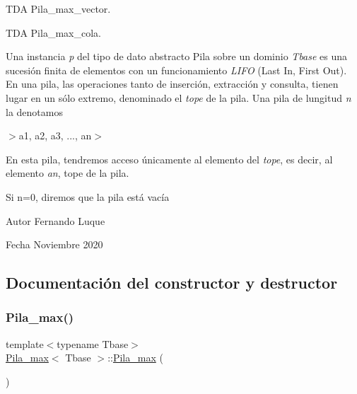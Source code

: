 T\+DA Pila\+\_\+max\+\_\+vector. 

T\+DA Pila\+\_\+max\+\_\+cola.

Una instancia {\itshape p} del tipo de dato abstracto Pila sobre un dominio {\itshape Tbase} es una sucesión finita de elementos con un funcionamiento {\itshape L\+I\+FO} (Last In, First Out). En una pila, las operaciones tanto de inserción, extracción y consulta, tienen lugar en un sólo extremo, denominado el {\itshape tope} de la pila. Una pila de lungitud {\itshape n} la denotamos


\begin{DoxyItemize}
\item $>$a1, a2, a3, ..., an$>$
\end{DoxyItemize}

En esta pila, tendremos acceso únicamente al elemento del {\itshape tope}, es decir, al elemento {\itshape an}, tope de la pila.

Si n=0, diremos que la pila está vacía

\begin{DoxyAuthor}{Autor}
Fernando Luque 
\end{DoxyAuthor}
\begin{DoxyDate}{Fecha}
Noviembre 2020 
\end{DoxyDate}


\subsection{Documentación del constructor y destructor}
\mbox{\label{classPila__max_a57b37a9e025685ae0c1ab172192dedb2}} 
\subsubsection{\texorpdfstring{Pila\+\_\+max()}{Pila\_max()}\hspace{0.1cm}{\footnotesize\ttfamily [1/4]}}
{\footnotesize\ttfamily template$<$typename Tbase$>$ \\
\hyperlink{classPila__max}{Pila\+\_\+max}$<$ Tbase $>$\+::\hyperlink{classPila__max}{Pila\+\_\+max} (\begin{DoxyParamCaption}{ }\end{DoxyParamCaption})\hspace{0.3cm}{\ttfamily [default]}}




